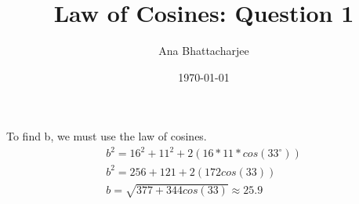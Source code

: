 \documentclass{article}
\begin{document}
\title{Law of Cosines: Question 1}
\author{Ana Bhattacharjee}
\date{\today}
\maketitle{}
\begin{center}
To find b, we must use the law of cosines.
\begin{align}
  b^2 = 16^2 + 11^2 + 2(16*11*cos(33^{\circ})) \\
  b^2 = 256 + 121 + 2(172cos(33)) \\
  b = \sqrt{377 + 344cos(33)} \approx 25.9
\end{align}
\end{center}
\end{document}
